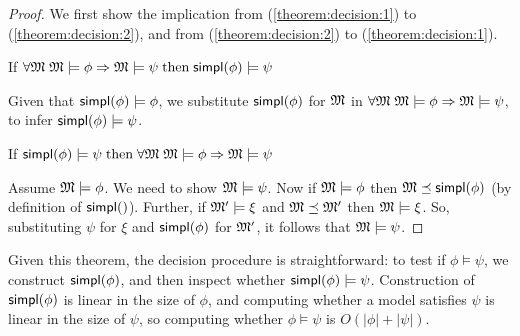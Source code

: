 \begin{proof}
We first show the implication from (\ref{theorem:decision:1}) to
(\ref{theorem:decision:2}), and from (\ref{theorem:decision:2}) to
(\ref{theorem:decision:1}).  \setcounter{mycase}{0}
\begin{mycase}
If $\forall \frak{M} \; \frak{M} \models \phi \Rightarrow \frak{M} \models \psi \; \text{then} \; \mathsf{simpl}(\phi) \models \psi$
\end{mycase}

\NI Given that $\mathsf{simpl}(\phi) \models \phi$, we substitute $\mathsf{simpl}(\phi)$ for $\frak{M} $ in
$\forall \frak{M} \; \frak{M} \models \phi \Rightarrow \frak{M} \models \psi$, to infer $\mathsf{simpl}(\phi)
\models \psi$.

\begin{mycase}
If $\mathsf{simpl}(\phi) \models \psi \; \text{then} \; \forall \frak{M} \; \frak{M} \models \phi \Rightarrow \frak{M} \models \psi$
\end{mycase}

\NI Assume $\frak{M} \models \phi$. We need to show $\frak{M} \models \psi$.  Now if $\frak{M}
\models \phi$ then $\frak{M} \preceq \mathsf{simpl}(\phi)$ (by definition of $\SIMPL$).  Further, if
$\frak{M}' \models \xi $ and $\frak{M} \preceq \frak{M}'$ then $\frak{M} \models \xi $. So, substituting $\psi$
for $\xi $ and $\mathsf{simpl}(\phi)$ for $\frak{M}'$, it follows that $\frak{M} \models \psi$.  
\end{proof}

\NI Given this theorem, the decision procedure is straightforward: to
test if $\phi \models \psi$, we construct $\mathsf{simpl}(\phi)$, and then inspect whether
$\mathsf{simpl}(\phi) \models \psi$.  Construction of $\mathsf{simpl}(\phi)$ is linear in the size of
$\phi$, and computing whether a model satisfies $\psi$ is linear in the size
of $\psi$, so computing whether $\phi \models \psi$ is $O(|\phi|+|\psi|)$.


